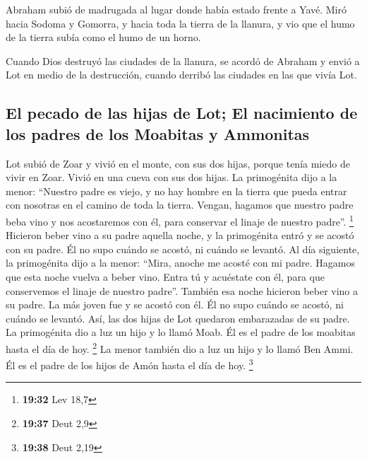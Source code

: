\begin{paracol}{2}
 Abraham subió de madrugada al lugar donde había estado
frente a Yavé.  Miró hacia Sodoma y Gomorra, y hacia toda
la tierra de la llanura, y vio que el humo de la tierra subía como el
humo de un horno.

 Cuando Dios destruyó las ciudades de la llanura, se
acordó de Abraham y envió a Lot en medio de la destrucción, cuando
derribó las ciudades en las que vivía Lot.

\hypertarget{el-pecado-de-las-hijas-de-lot-el-nacimiento-de-los-padres-de-los-moabitas-y-ammonitas}{%
\subsection{El pecado de las hijas de Lot; El nacimiento de los padres
de los Moabitas y
Ammonitas}\label{el-pecado-de-las-hijas-de-lot-el-nacimiento-de-los-padres-de-los-moabitas-y-ammonitas}}

 Lot subió de Zoar y vivió en el monte, con sus dos
hijas, porque tenía miedo de vivir en Zoar. Vivió en una cueva con sus
dos hijas.  La primogénita dijo a la menor: ``Nuestro
padre es viejo, y no hay hombre en la tierra que pueda entrar con
nosotras en el camino de toda la tierra.  Vengan, hagamos
que nuestro padre beba vino y nos acostaremos con él, para conservar el
linaje de nuestro padre''. \footnote{\textbf{19:32} Lev 18,7}
 Hicieron beber vino a su padre aquella noche, y la
primogénita entró y se acostó con su padre. Él no supo cuándo se acostó,
ni cuándo se levantó.  Al día siguiente, la primogénita
dijo a la menor: ``Mira, anoche me acosté con mi padre. Hagamos que esta
noche vuelva a beber vino. Entra tú y acuéstate con él, para que
conservemos el linaje de nuestro padre''.  También esa
noche hicieron beber vino a su padre. La más joven fue y se acostó con
él. Él no supo cuándo se acostó, ni cuándo se levantó. 
Así, las dos hijas de Lot quedaron embarazadas de su padre.
 La primogénita dio a luz un hijo y lo llamó Moab. Él es
el padre de los moabitas hasta el día de hoy. \footnote{\textbf{19:37}
  Deut 2,9}  La menor también dio a luz un hijo y lo
llamó Ben Ammi. Él es el padre de los hijos de Amón hasta el día de hoy.
\footnote{\textbf{19:38} Deut 2,19}

\switchcolumn
\begin{otherlanguage}{english}

\hypertarget{the-fall-of-sodom-and-gomorrha}{%
}
\end{otherlanguage}
\end{paracol}
